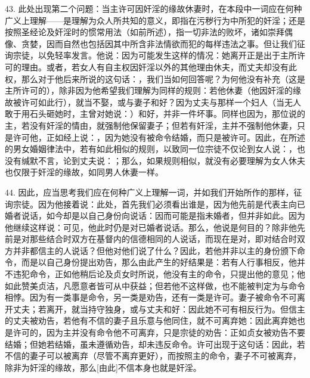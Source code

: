43. 此处出现第二个问题：当主许可因奸淫的缘故休妻时，在本段中一词应在何种广义上理解——是理解为众人所共知的意义，即指在污秽行为中所犯的奸淫；还是按照圣经论及奸淫时的惯常用法（如前所述），指一切非法的败坏，诸如崇拜偶像、贪婪，因而自然也包括因其中所含非法情欲而犯的每样违法之事。但让我们征询宗徒，以免轻率发言。他说：因为可能发生这样的情况：她离开正是出于主所许可的理由。或者，若女人有自主权因奸淫以外的其他理由休夫，而丈夫却没有此权，那么对于他后来所说的这句话：，我们当如何回答呢？为何他没有补充（这是主所许可的），除非因为他希望我们理解为同样的规则：若他休妻（他因奸淫的缘故被许可如此行），就当不娶，或与妻子和好？因为丈夫与那样一个妇人（当无人敢于用石头砸她时，主曾对她说：）和好，并非一件坏事。同样也因为，那位说的主，若没有奸淫的情由，就强制他保留妻子；但若有奸淫，主并不强制他休妻，只是许可他，正如经上说：，因为她没有被命令结婚，而只是被许可。因此，在所述的男女婚姻律法中，若有如此相似的规则，以致同一位宗徒不仅论到女人说：，也没有缄默不言，论到丈夫说：；那么，如果规则相似，就没有必要理解为女人休夫也仅限于奸淫的缘故，如同男人休妻一样。\par

44. 因此，应当思考我们应在何种广义上理解一词，并如我们开始所作的那样，征询宗徒。因为他接着说：此处，首先我们必须看出谁是，因为他先前是代表主向已婚者说话，如今却是以自己身份向说话：因而可能是指未婚者，但并非如此。因为他继续这样说：可见，他此时仍是对已婚者说话。那么，他说是何目的？除非他先前是对那些结合时双方在基督内的信德相同的人说话，而现在是对，即对结合时双方并非都信主的人说话？但他对他们说了什么？因此，若他并非以主的身份颁下命令，而是以自己身份提出劝告，那么由此产生的好结果是：若有人行事相反，他并不违犯命令，正如他稍后论及贞女时所说，他没有主的命令，只提出他的意见；他如此赞美贞洁，凡愿意者皆可从中获益；但若他不这样做，也不能被判定为与命令相悖。因为有一类事是命令，另一类是劝告，还有一类是许可。妻子被命令不可离开丈夫；若离开，就当持守独身，或与丈夫和好：因此她不可有相反行为。但信主的丈夫被劝告，若他有不信的妻子且乐意与他同住，就不可离弃她：因此离弃她也是许可的，因为主并没有命令他不可离弃，只是宗徒的劝告：正如贞女被劝告不要结婚；但她若结婚，虽未遵循劝告，却未违反命令。许可出现于这句话：因此，若不信的妻子可以被离弃（尽管不离弃更好），而按照主的命令，妻子不可被离弃，除非为奸淫的缘故，那么[由此]不信本身也就是奸淫。\par

